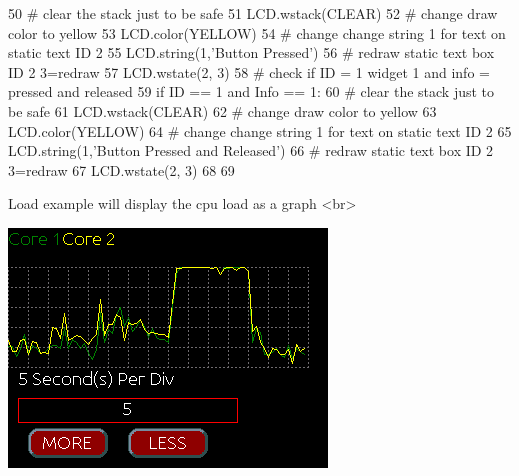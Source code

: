 \begin{DoxyCodeInclude}
50         \textcolor{comment}{# clear the stack just to be safe}
51         LCD.wstack(CLEAR)
52         \textcolor{comment}{# change draw color to yellow}
53         LCD.color(YELLOW)
54         \textcolor{comment}{# change change string 1 for text on static text ID 2}
55         LCD.string(1,\textcolor{stringliteral}{'Button Pressed'})
56         \textcolor{comment}{# redraw static text box ID 2 3=redraw      }
57         LCD.wstate(2, 3)
58     \textcolor{comment}{# check if ID = 1 widget 1 and info = pressed and released}
59     \textcolor{keywordflow}{if} ID == 1 \textcolor{keywordflow}{and} Info == 1:
60         \textcolor{comment}{# clear the stack just to be safe}
61         LCD.wstack(CLEAR)
62         \textcolor{comment}{# change draw color to yellow}
63         LCD.color(YELLOW)
64         \textcolor{comment}{# change change string 1 for text on static text ID 2}
65         LCD.string(1,\textcolor{stringliteral}{'Button Pressed and Released'})
66         \textcolor{comment}{# redraw static text box ID 2 3=redraw}
67         LCD.wstate(2, 3)
68 
69         
\end{DoxyCodeInclude}
 \begin{DoxyVerb}Load example will display the cpu load as a graph  <br>
\end{DoxyVerb}
  
\begin{DoxyImageNoCaption}
  \mbox{\includegraphics{load.png}}
\end{DoxyImageNoCaption}
 
